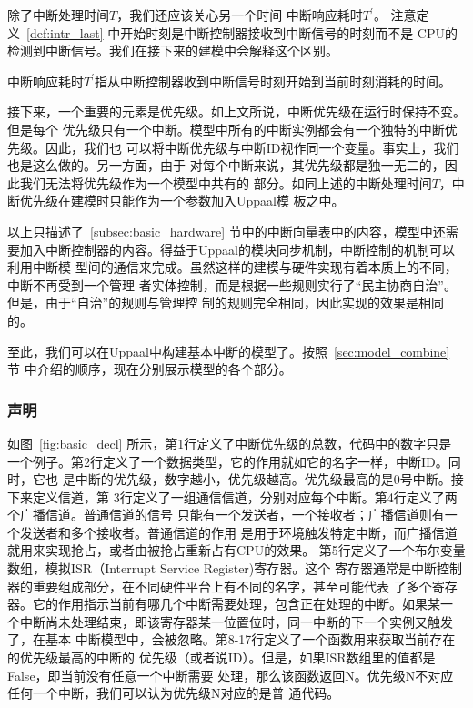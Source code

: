 除了中断处理时间$T$，我们还应该关心另一个时间 \pozhehao 中断响应耗时$T^\prime$。
注意定义~\ref{def:intr_last} 中开始时刻是中断控制器接收到中断信号的时刻而不是
CPU的检测到中断信号。我们在接下来的建模中会解释这个区别。

\begin{definition}
	中断响应耗时$T^\prime$指从中断控制器收到中断信号时刻开始到当前时刻消耗的时间。
	\label{def:intr_last}
\end{definition}

接下来，一个重要的元素是优先级。如上文所说，中断优先级在运行时保持不变。但是每个
优先级只有一个中断。模型中所有的中断实例都会有一个独特的中断优先级。因此，我们也
可以将中断优先级与中断ID视作同一个变量。事实上，我们也是这么做的。另一方面，由于
对每个中断来说，其优先级都是独一无二的，因此我们无法将优先级作为一个模型中共有的
部分。如同上述的中断处理时间$T$，中断优先级在建模时只能作为一个参数加入Uppaal模
板之中。

以上只描述了~\ref{subsec:basic_hardware} 节中的中断向量表中的内容，模型中还需
要加入中断控制器的内容。得益于Uppaal的模块同步机制，中断控制的机制可以利用中断模
型间的通信来完成。虽然这样的建模与硬件实现有着本质上的不同，中断不再受到一个管理
者实体控制，而是根据一些规则实行了“民主协商自治”。但是，由于“自治”的规则与管理控
制的规则完全相同，因此实现的效果是相同的。

至此，我们可以在Uppaal中构建基本中断的模型了。按照~\ref{sec:model_combine} 节
中介绍的顺序，现在分别展示模型的各个部分。

\subsubsection{声明}
\label{subsubsec:basic_decl}

如图~\ref{fig:basic_decl} 所示，第1行定义了中断优先级的总数，代码中的数字只是
一个例子。第2行定义了一个数据类型，它的作用就如它的名字一样，中断ID。同时，它也
是中断的优先级，数字越小，优先级越高。优先级最高的是0号中断。接下来定义信道，第
3行定义了一组通信信道，分别对应每个中断。第4行定义了两个广播信道。普通信道的信号
只能有一个发送者，一个接收者；广播信道则有一个发送者和多个接收者。普通信道的作用
是用于环境触发特定中断，而广播信道就用来实现抢占，或者由被抢占重新占有CPU的效果。
第5行定义了一个布尔变量数组，模拟ISR（Interrupt Service Register)寄存器。这个
寄存器通常是中断控制器的重要组成部分，在不同硬件平台上有不同的名字，甚至可能代表
了多个寄存器。它的作用指示当前有哪几个中断需要处理，包含正在处理的中断。如果某一
个中断尚未处理结束，即该寄存器某一位置位时，同一中断的下一个实例又触发了，在基本
中断模型中，会被忽略。第8-17行定义了一个函数用来获取当前存在的优先级最高的中断的
优先级（或者说ID）。但是，如果ISR数组里的值都是False，即当前没有任意一个中断需要
处理，那么该函数返回N。优先级N不对应任何一个中断，我们可以认为优先级N对应的是普
通代码。

